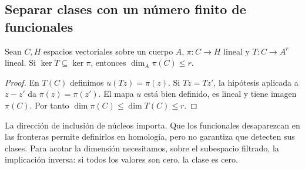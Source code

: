 \subsection{Separar clases con un número finito de funcionales}

\begin{lema}
\label{lem:rh-factorizacion}
Sean $C,H$ espacios vectoriales sobre un cuerpo $A$, $\pi:C\to H$ lineal y $T:C\to A^r$ lineal. Si $\ker T\subseteq\ker\pi$, entonces $\dim_A\pi(C)\le r$.
\end{lema}
\begin{proof}
En $T(C)$ definimos $u(Tz)=\pi(z)$. Si $Tz=Tz'$, la hipótesis aplicada a $z-z'$ da $\pi(z)=\pi(z')$. El mapa $u$ está bien definido, es lineal y tiene imagen $\pi(C)$. Por tanto $\dim\pi(C)\le\dim T(C)\le r$.
\end{proof}

La dirección de inclusión de núcleos importa. Que los funcionales desaparezcan en las fronteras permite definirlos en homología, pero no garantiza que detecten sus clases. Para acotar la dimensión necesitamos, sobre el subespacio filtrado, la implicación inversa: si todos los valores son cero, la clase es cero.

